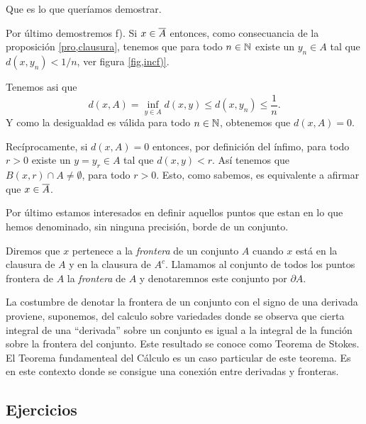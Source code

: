 \begin{demo}
Que es lo que queríamos demostrar.

Por último demostremos f). Si $x\in \overline{A}$ entonces, como
consecuancia de la proposición \vref{pro,clausura}, tenemos que
para todo $n\in\mathbb{N}$ existe un $y_n\in A$ tal que $d(x,y_n)<1/n$,
ver figura \vref{fig,incf)}.


Tenemos asi que
\[d(x,A)=\inf\limits_{y\in A}d(x,y)\leq d(x,y_n)\leq \frac1n.\]
Y como la desigualdad es válida para todo $n\in\mathbb{N}$, obtenemos
que $d(x,A)=0$.

Recíprocamente, si $d(x,A)=0$ entonces, por definición del
ínfimo, para todo $r>0$ existe un $y=y_r\in A$ tal que
$d(x,y)<r$. Así tenemos que $B(x,r)\cap A\neq \emptyset$,
para todo $r>0$. Esto, como sabemos, es equivalente a afirmar que
$x\in \overline{A}$.
\end{demo}

Por último estamos interesados en definir aquellos puntos que
estan en lo que hemos denominado, sin ninguna precisión, borde
de un conjunto.

\begin{definicion}{} Diremos que $x$ pertenece a la \emph{frontera} de un
conjunto $A$ cuando $x$ está en la clausura de $A$ y en la
clausura de $A^c$. Llamamos al conjunto de todos los puntos
frontera de $A$ la \emph{frontera }de $A$ y denotaremnos este
conjunto por $\partial A$. \end{definicion}


La costumbre de denotar la frontera de un conjunto con el signo de
una derivada proviene, suponemos, del calculo sobre variedades
donde se observa que cierta integral de una ``derivada'' sobre un
conjunto es igual a la integral de la función sobre la frontera
del conjunto. Este resultado se conoce como Teorema de Stokes. El
Teorema fundamenteal del Cálculo es un caso particular de este
teorema. Es en este contexto donde se consigue una conexión
entre derivadas y fronteras.






\subsection{Ejercicios}

